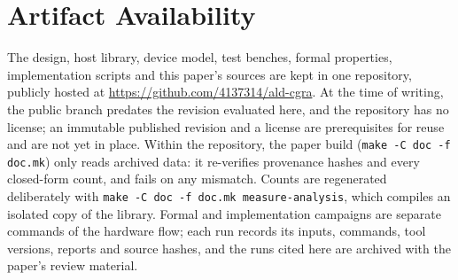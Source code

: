 \section{Artifact Availability}
\label{sec:artifact}

The design, host library, device model, test benches, formal properties,
implementation scripts and this paper's sources are kept in one repository,
publicly hosted at \url{https://github.com/4137314/ald-cgra}. At the time of
writing, the public branch predates the revision evaluated here, and the
repository has no license; an immutable published revision and a license are
prerequisites for reuse and are not yet in place. Within the repository,
the paper build (\texttt{make -C doc -f doc.mk}) only reads archived data:
it re-verifies provenance hashes and every closed-form count, and fails on
any mismatch. Counts are regenerated deliberately with
\texttt{make -C doc -f doc.mk measure-analysis}, which compiles an isolated
copy of the library. Formal and implementation campaigns are separate
commands of the hardware flow; each run records its inputs, commands, tool
versions, reports and source hashes, and the runs cited here are archived
with the paper's review material.
